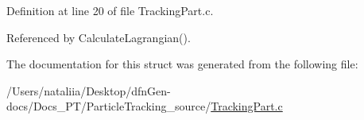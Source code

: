 Definition at line 20 of file Tracking\+Part.\+c.



Referenced by Calculate\+Lagrangian().



The documentation for this struct was generated from the following file\+:\begin{DoxyCompactItemize}
\item 
/\+Users/nataliia/\+Desktop/dfn\+Gen-\/docs/\+Docs\+\_\+\+P\+T/\+Particle\+Tracking\+\_\+source/\mbox{\hyperlink{_tracking_part_8c}{Tracking\+Part.\+c}}\end{DoxyCompactItemize}
